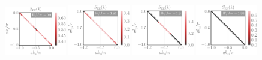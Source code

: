 \documentclass[reprint,hidelinks,onecolumn]{revtex4-2}
\begin{document}
\begin{figure}[htpb]
	\includegraphics[width=0.24\textwidth]{tiled_SEE_k-1.pdf}
	\includegraphics[width=0.24\textwidth]{tiled_SEE_k-2.pdf}
	\includegraphics[width=0.24\textwidth]{tiled_SEE_k-3.pdf}
	\includegraphics[width=0.24\textwidth]{tiled_SEE_k-4.pdf}


\end{figure}
\end{document}
